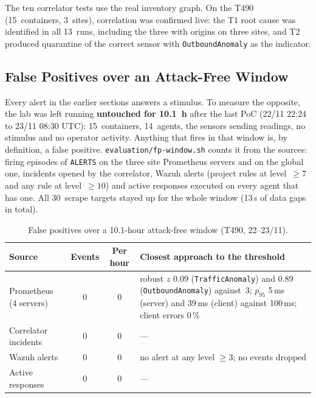 \documentclass[11pt,a4paper]{article}
\begin{document}
The ten correlator tests use the real inventory graph. On the T490 (15~containers, 3~sites),
correlation was confirmed live: the T1 root cause was identified in all 13~runs, including the
three with origins on three sites, and
T2 produced quarantine of the correct sensor with \texttt{OutboundAnomaly} as the indicator.

\subsection{False Positives over an Attack-Free Window}
\label{sec:fp}

Every alert in the earlier sections answers a stimulus. To measure the opposite, the lab was
left running \textbf{untouched for 10.1~h} after the last PoC (22/11 22:24 to 23/11 08:30 UTC):
15~containers, 14~agents, the sensors sending readings, no stimulus and no operator activity.
Anything that fires in that window is, by definition, a false positive.
\texttt{evaluation/fp-window.sh} counts it from the sources: firing episodes of \texttt{ALERTS}
on the three site Prometheus servers and on the global one, incidents opened by the correlator,
Wazuh alerts (project rules at level~$\geq 7$ and any rule at level~$\geq 10$) and active
responses executed on every agent that has one. All 30~scrape targets stayed up for the whole
window (13\,s of data gaps in total).

\begin{table}[H]
  \centering
  \caption{False positives over a 10.1-hour attack-free window (T490, 22--23/11).}
  \label{tab:fp}
  \begin{tabular}{@{}lccp{7.2cm}@{}}
    \toprule
    \textbf{Source} & \textbf{Events} & \textbf{Per hour} & \textbf{Closest approach to the threshold} \\
    \midrule
    Prometheus (4 servers) & 0 & 0 & robust $z$ 0.09 (\texttt{TrafficAnomaly}) and 0.89
      (\texttt{OutboundAnomaly}) against~3; $p_{95}$ 5\,ms (server) and 39\,ms (client)
      against 100\,ms; client errors 0\,\% \\
    Correlator incidents & 0 & 0 & --- \\
    Wazuh alerts & 0 & 0 & no alert at any level $\geq 3$; no events dropped \\
    Active responses & 0 & 0 & --- \\
    \bottomrule
  \end{tabular}
\end{table}
\end{document}
